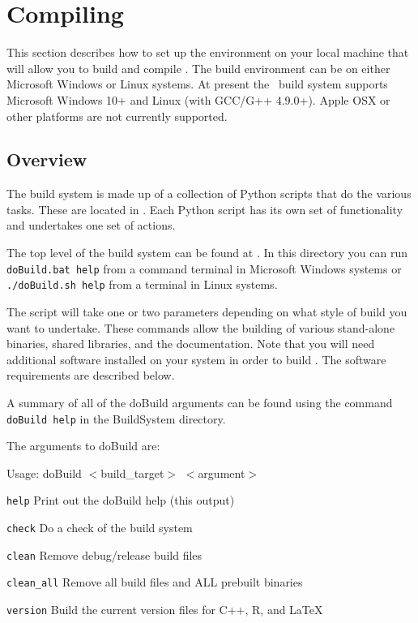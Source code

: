\section{Compiling \CNAME}\label{sec:build_environment}

This section describes how to set up the environment on your local machine that will allow you to build and compile \CNAME. The build environment can be on either Microsoft Windows or Linux systems. At present the \CNAME\ build system supports Microsoft Windows 10+ and Linux (with GCC/G++ 4.9.0+). Apple OSX or other platforms are not currently supported.

\subsection{Overview}

The build system is made up of a collection of Python scripts that do the various tasks. These are located in . Each Python script has its own set of functionality and undertakes one set of actions.

The top level of the build system can be found at . In this directory you can run \texttt{doBuild.bat help} from a command terminal in Microsoft Windows systems or \texttt{./doBuild.sh help} from a terminal in Linux systems.

The script will take one or two parameters depending on what style of build you want to undertake. These commands allow the building of various stand-alone binaries, shared libraries, and the documentation. Note that you will need additional software installed on your system in order to build \CNAME.  The software requirements are described below.

A summary of all of the doBuild arguments can be found using the command \texttt{doBuild help} in the BuildSystem directory.

The arguments to doBuild are:

Usage: doBuild $<$build\_target$>$ $<$argument$>$
\begin{description}
  \item{\texttt{help}} Print out the doBuild help (this output)
  \item{\texttt{check}} Do a check of the build system
  \item{\texttt{clean}} Remove debug/release build files
  \item{\texttt{clean\_all}} Remove all build files and ALL prebuilt binaries
  \item{\texttt{version}} Build the current version files for C++, R, and LaTeX
\end{description}

